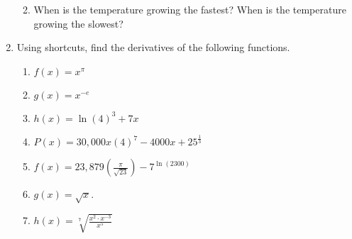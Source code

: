 \documentclass[11pt]{article}
\begin{document}
\begin{enumerate}
\begin{enumerate}
\begin{center}
\begin{tikzpicture}[yscale = 7/80]
      \end{tikzpicture}
    \end{center}
  \item When is the temperature growing the fastest?  When is the
    temperature growing the slowest?
    \vfill
  \end{enumerate}

\item Using shortcuts, find the derivatives of the following
  functions.
  \begin{enumerate}
  \item $f(x)=x^\pi$
    \vfill
    \newpage
  \item $g(x)=x^{-e}$
    \vfill
  \item $h(x)=\ln(4)^3+7x$
    \vfill
  \item $\displaystyle P(x)=30,000x(4)^7-4000x+25^{\frac{1}{3}}$
    \vfill
    \newpage
  \item $\displaystyle
    f(x)=23,879\left(\frac{\pi}{\sqrt{23}}\right)-7^{\ln(2300)}$
    \vfill
  \item $g(x) = \sqrt{x}$.
    \vfill
  \item $h(x) = \displaystyle\sqrt[7]{\frac{x^2\cdot x^{-3}}{x^5}}$
    \vfill
  \end{enumerate}






\end{enumerate}
\end{document}
